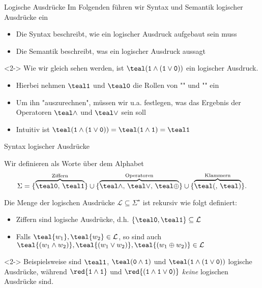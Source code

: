\begin{frame}[label=logexpr_intro]{Logische Ausdr\"ucke}
Im Folgenden f\"uhren wir \alert{Syntax} und \alert{Semantik} logischer Ausdr\"ucke ein
\begin{itemize}
    \item Die \alert{Syntax} beschreibt, \alert{wie} ein logischer Ausdruck aufgebaut sein muss
    \item Die \alert{Semantik} beschreibt, \alert{was} ein logischer Ausdruck aussagt
\end{itemize}

\begin{example}<2->
Wie wir gleich sehen werden, ist $\logic{(1 \land (1 \lor 0))}$ ein logischer Ausdruck.
\begin{itemize}
    \item Hierbei nehmen $\logic{1}$ und $\logic{0}$ die Rollen von "" und "" ein
    \item Um ihn "auszurechnen", m\"ussen wir u.a. festlegen, was das Ergebnis der Operatoren $\logic{\land}$ und $\logic{\lor}$ sein soll
    \item Intuitiv ist $\logic{(1 \land (1 \lor 0))} = \logic{(1 \land 1)} = \logic{1}$
\end{itemize}
\end{example}
\end{frame}

\begin{frame}{Syntax logischer Ausdr\"ucke}
\begin{definition}\label{sq:def:logexp_syn}
Wir definieren  als Worte \"uber dem Alphabet $$\Sigma = \{ \overbrace{\logic{0}, \, \logic{1}}^{\text{Ziffern}} \} \cup \{ \overbrace{\logic{\land}, \, \logic{\lor}, \, \logic{\oplus}}^{\text{Operatoren}}\} \cup \{ \overbrace{\logic{(}, \, \logic{)}}^{\text{Klammern}} \}.$$

Die Menge der logischen Ausdr\"ucke $\mathcal{L} \subseteq \Sigma^{\star}$ ist rekursiv wie folgt definiert:
\begin{itemize}
    \item Ziffern sind logische Ausdr\"ucke, d.h. $\{ \logic{0}, \logic{1} \} \subseteq \mathcal{L}$
    \item Falls $\teal{w_1}, \teal{w_2} \in \mathcal{L}$, so sind auch $\teal{(w_1 \land w_2)}, \teal{(w_1 \lor w_2)}, \teal{(w_1 \oplus w_2)} \in \mathcal{L}$
\end{itemize}
\end{definition}
\begin{example}<2->
Beispielsweise sind $\logic{1}$, $\logic{(0 \land 1)}$ und $\logic{(1 \land (1 \lor 0))}$ logische Ausdr\"ucke, w\"ahrend $\mathtt{\red{1 \land 1}}$ und $\mathtt{\red{(1 \land 1 \lor 0)}}$ \emph{keine} logischen Ausdr\"ucke sind.
\end{example}
\end{frame}

